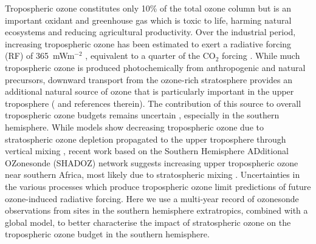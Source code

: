 \documentclass[acp, manuscript]{copernicus} %
\providecommand{\DIFadd}[1]{{\protect\color{blue}\uwave{#1}}} %
\providecommand{\DIFaddbegin}{} %
\providecommand{\DIFaddend}{} %
\begin{document}
  Tropospheric ozone constitutes only 10\% of the total ozone column but is an important oxidant and greenhouse gas which is toxic to life, harming natural ecosystems and reducing agricultural productivity.
  Over the industrial period, increasing tropospheric ozone has been estimated to exert a radiative forcing (RF) of 365~mWm$^{-2}$  \citep{Stevenson2013}, equivalent to a quarter of the CO$_2$ forcing \citep{IPCC_Chapter2}. 
  While much tropospheric ozone is produced photochemically from anthropogenic and natural precursors, %
  downward transport from the ozone-rich stratosphere provides an additional natural source of ozone that is particularly important in the upper troposphere (\citet{Jacobson2000} and references therein).
  The contribution of this source to overall tropospheric ozone budgets remains uncertain \DIFaddbegin \DIFadd{\mbox{%
\citep{Skerlak2014}
}%
}\DIFaddend , especially in the southern hemisphere.
  While models show decreasing tropospheric ozone due to stratospheric ozone depletion propagated to the upper troposphere through vertical mixing \citep{Stevenson2013}, recent work based on the Southern Hemisphere ADditional OZonesonde (SHADOZ) network suggests increasing upper tropospheric ozone near southern Africa, most likely due to stratospheric mixing \citep{Liu2015, Thompson2014}.
  Uncertainties in the various processes which produce tropospheric ozone limit predictions of future ozone-induced radiative forcing.
  Here we use a multi-year record of ozonesonde observations from sites in the southern hemisphere extratropics, combined with a global model, to better characterise the impact of stratospheric ozone on the tropospheric ozone budget in the southern hemisphere.
\end{document}
